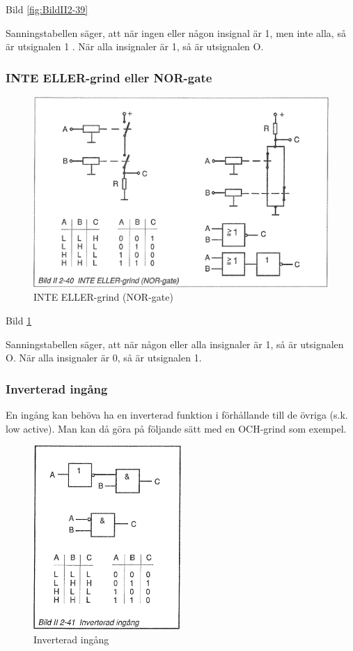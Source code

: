 Bild \ref{fig:BildII2-39}

Sanningstabellen säger, att när ingen eller någon insignal är 1, men inte alla,
så är utsignalen 1 . När alla insignaler är 1, så är utsignalen O.

\subsubsection{INTE ELLER-grind eller NOR-gate}

\begin{figure}
\includegraphics[width=\textwidth]{images/bild_2_2-40}
\caption{INTE ELLER-grind (NOR-gate)}
\label{fig:BildII2-40}
\end{figure}

Bild \ref{fig:BildII2-40}

Sanningstabellen säger, att när någon eller alla insignaler är 1, så är
utsignalen O. När alla insignaler är 0, så är utsignalen 1.

\subsubsection{Inverterad ingång}

En ingång kan behöva ha en inverterad funktion i förhållande till de övriga
(s.k. low active). Man kan då göra på följande sätt med en OCH-grind som
exempel.

\begin{figure}
\includegraphics[width=0.5\textwidth]{images/bild_2_2-41}
\caption{Inverterad ingång}
\label{fig:BildII2-41}
\end{figure}

